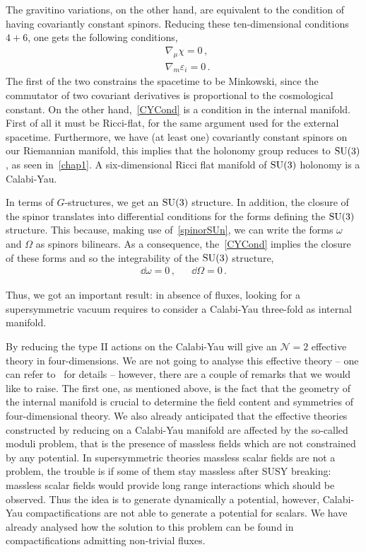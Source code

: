 \documentclass[debug]{phd}
\begin{document}
				The gravitino variations, on the other hand, are equivalent to the condition of having covariantly constant spinors.
				Reducing these ten-dimensional conditions $4 + 6$, one gets the following conditions,
						\begin{align}
							\label{MinkCond}	&\nabla_\mu \chi = 0 \, , \\
							\label{CYCond}		&\nabla_m \varepsilon_i = 0 \, .
						\end{align}
				The first of the two constrains the spacetime to be Minkowski, since the commutator of two covariant derivatives is proportional to the cosmological constant.
				On the other hand,~\eqref{CYCond} is a condition in the internal manifold.
				First of all it must be Ricci-flat, for the same argument used for the external spacetime.
				Furthermore, we have (at least one) covariantly constant spinors on our Riemannian manifold, this implies that the holonomy group reduces to $\mathrm{SU}(3)$, as seen in~\cref{chap1}.
				A six-dimensional Ricci flat manifold of $\mathrm{SU}(3)$ holonomy is a Calabi-Yau.
				
				In terms of $G$-structures, we get an $\mathrm{SU}(3)$ structure.
				In addition, the closure of the spinor translates into differential conditions for the forms defining the $\mathrm{SU}(3)$ structure.
				This because, making use of~\eqref{spinorSUn}, we can write the forms $\omega$ and $\Omega$ as spinors bilinears.
				As a consequence, the~\eqref{CYCond} implies the closure of these forms and so the integrability of the $\mathrm{SU}(3)$ structure,
						\begin{equation}
							\begin{array}{lcr}
								\dd \omega = 0\, , & & \dd \Omega = 0 \, .
							\end{array}
						\end{equation}
				
				Thus, we got an important result: in absence of fluxes, looking for a supersymmetric vacuum requires to consider a Calabi-Yau three-fold as internal manifold.
				
				By reducing the type II actions on the Calabi-Yau will give an $\mathcal{N} = 2$ effective theory in four-dimensions.
				We are not going to analyse this effective theory -- one can refer to~\cite{CeresoleN2, Bodner:1990zm} for details -- however, there are a couple of remarks that we would like to raise.
				The first one, as mentioned above, is the fact that the geometry of the internal manifold is crucial to determine the field content and symmetries of four-dimensional theory.
				We also already anticipated that the effective theories constructed by reducing on a Calabi-Yau manifold are affected by the so-called moduli problem, that is the presence of massless fields which are not constrained by any potential.
				In supersymmetric theories massless scalar fields are not a problem, the trouble is if some of them stay massless after SUSY breaking: massless scalar fields would provide long range interactions which should be observed.
				Thus the idea is to generate dynamically a potential, however, Calabi-Yau compactifications are not able to generate a potential for scalars.
				We have already analysed how the solution to this problem can be found in compactifications admitting non-trivial fluxes.
\end{document}
